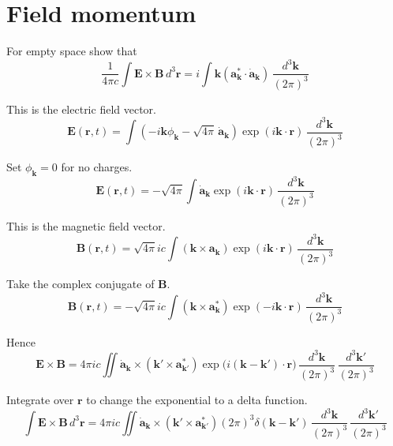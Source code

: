 


\section*{Field momentum}

For empty space show that
\begin{equation*}
\frac{1}{4\pi c}\int\mathbf E\times\mathbf B\,d^3\mathbf r
=i\int\mathbf k\left(\mathbf a_{\mathbf k}^*\cdot\dot{\mathbf a}_{\mathbf k}\right)\,
\frac{d^3\mathbf k}{(2\pi)^3}
\end{equation*}

This is the electric field vector.
\begin{equation*}
\mathbf E(\mathbf r,t)
=\int\left(-i\mathbf k\phi_{\mathbf k}-\sqrt{4\pi}\,\dot{\mathbf a}_{\mathbf k}\right)
\exp(i\mathbf k\cdot\mathbf r)\,
\frac{d^3\mathbf k}{(2\pi)^3}
\end{equation*}

Set $\phi_{\mathbf k}=0$ for no charges.
\begin{equation*}
\mathbf E(\mathbf r,t)
=-\sqrt{4\pi}\int\dot{\mathbf a}_{\mathbf k}
\exp(i\mathbf k\cdot\mathbf r)\,
\frac{d^3\mathbf k}{(2\pi)^3}
\end{equation*}

This is the magnetic field vector.
\begin{equation*}
\mathbf B(\mathbf r,t)
=\sqrt{4\pi}ic\int(\mathbf k\times\mathbf a_{\mathbf k})
\exp(i\mathbf k\cdot\mathbf r)\,
\frac{d^3\mathbf k}{(2\pi)^3}
\end{equation*}

Take the complex conjugate of $\mathbf B$.
\begin{equation*}
\mathbf B(\mathbf r,t)
=-\sqrt{4\pi}ic\int(\mathbf k\times\mathbf a_{\mathbf k}^*)
\exp(-i\mathbf k\cdot\mathbf r)\,
\frac{d^3\mathbf k}{(2\pi)^3}
\end{equation*}

Hence
\begin{equation*}
\mathbf E\times\mathbf B
=4\pi ic\iint\dot{\mathbf a}_{\mathbf k}\times(\mathbf k'\times\mathbf a_{\mathbf k'}^*)
\exp\bigl(i(\mathbf k-\mathbf k')\cdot\mathbf r\bigr)
\,\frac{d^3\mathbf k}{(2\pi)^3}\,\frac{d^3\mathbf k'}{(2\pi)^3}
\end{equation*}

Integrate over $\mathbf r$ to change the exponential to a delta function.
\begin{equation*}
\int\mathbf E\times\mathbf B\,d^3\mathbf r
=4\pi ic\iint\dot{\mathbf a}_{\mathbf k}\times(\mathbf k'\times\mathbf a_{\mathbf k'}^*)
(2\pi)^3\delta(\mathbf k-\mathbf k')
\,\frac{d^3\mathbf k}{(2\pi)^3}\,\frac{d^3\mathbf k'}{(2\pi)^3}
\end{equation*}


